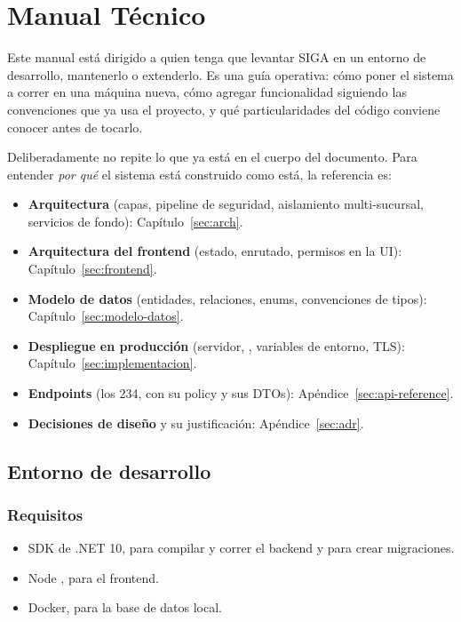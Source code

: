 \chapter{Manual Técnico}
\label{sec:manual-tecnico}

Este manual está dirigido a quien tenga que levantar SIGA en un entorno de desarrollo, mantenerlo o extenderlo. Es una guía operativa: cómo poner el sistema a correr en una máquina nueva, cómo agregar funcionalidad siguiendo las convenciones que ya usa el proyecto, y qué particularidades del código conviene conocer antes de tocarlo.

Deliberadamente no repite lo que ya está en el cuerpo del documento. Para entender \emph{por qué} el sistema está construido como está, la referencia es:

\begin{itemize}
  \item \textbf{Arquitectura} (capas, pipeline de seguridad, aislamiento multi-sucursal, servicios de fondo): Capítulo~\ref{sec:arch}.
  \item \textbf{Arquitectura del frontend} (estado, enrutado, permisos en la UI): Capítulo~\ref{sec:frontend}.
  \item \textbf{Modelo de datos} (entidades, relaciones, enums, convenciones de tipos): Capítulo~\ref{sec:modelo-datos}.
  \item \textbf{Despliegue en producción} (servidor, \allowbreak {}\allowbreak {}, variables de entorno, TLS): Capítulo~\ref{sec:implementacion}.
  \item \textbf{Endpoints} (los 234, con su policy y sus DTOs): Apéndice~\ref{sec:api-reference}.
  \item \textbf{Decisiones de diseño} y su justificación: Apéndice~\ref{sec:adr}.
\end{itemize}

\section{Entorno de desarrollo}
\label{sec:mt-entorno}

\subsection{Requisitos}
\label{sec:mt-requisitos}

\begin{itemize}
  \item SDK de .NET 10, para compilar y correr el backend y para crear migraciones.
  \item Node , para el frontend.
  \item Docker, para la base de datos local.
\end{itemize}

